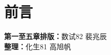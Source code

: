 \chapter*{前言}

\begin{tcolorbox}[title={\bfseries 参与排版成员}]
	 \textbf{第一至五章排版：}数试82 裴兆辰\\
	 \textbf{整理：}化生81 高旭帆\\
\end{tcolorbox}

\newpage